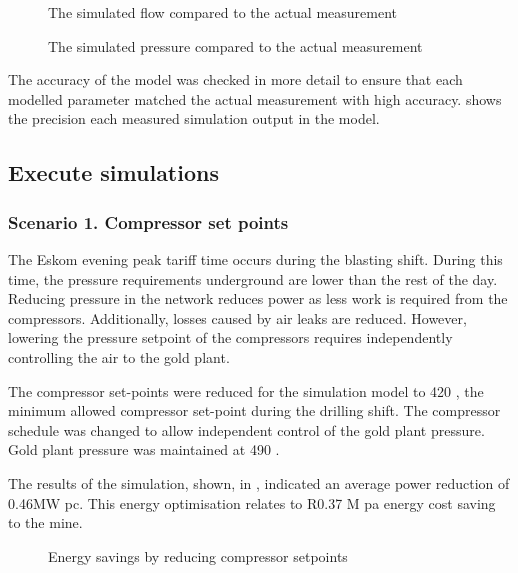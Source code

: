 \begin{figure}[h!]
	\centering
	
	\caption{The simulated flow compared to the actual measurement}
	\label{fig: Verification flow Beatrix}
\end{figure}
\begin{figure}[h!]
	\centering
	
	\caption{The simulated pressure compared to the actual measurement}
	\label{fig: Verification Pressure Beatrix}
\end{figure}
\par
The accuracy of the model was checked in more detail to ensure that each modelled parameter matched the actual measurement with high accuracy.  shows the precision each measured simulation output in the model.
\subsection{Execute simulations}
\subsubsection{Scenario 1. Compressor set points}
The Eskom evening peak tariff time occurs during the blasting shift. During this time, the pressure requirements underground are lower than the rest of the day. Reducing pressure in the network reduces power as less work is required from the compressors. Additionally, losses caused by air leaks are reduced. However, lowering the pressure setpoint of the compressors requires independently controlling the air to the gold plant. 
\par 
The compressor set-points were reduced for the simulation model to 420 , the minimum allowed compressor set-point during the drilling shift. The compressor schedule was changed to allow independent control of the gold plant pressure. Gold plant pressure was maintained at 490 . 
\par 
The results of the simulation, shown, in , indicated an average power reduction of 0.46MW \gls{pc}. This energy optimisation relates to R0.37 M \gls{pa} energy cost saving to the mine. 
\begin{figure}[h!]
	\centering
	
	\caption{Energy savings by reducing compressor setpoints}
	\label{fig: CompSetpoints Results Beatrix}
\end{figure}

